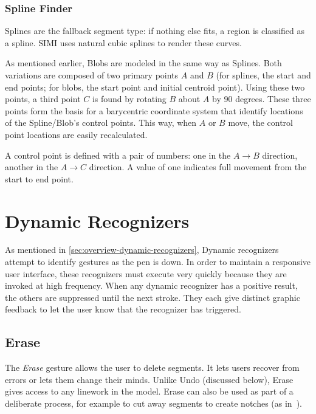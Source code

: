 \subsubsection{Spline Finder}

Splines are the fallback segment type: if nothing else fits, a region
is classified as a spline. SIMI uses natural cubic splines to render
these curves.

As mentioned earlier, Blobs are modeled in the same way as
Splines. Both variations are composed of two primary points $A$ and
$B$ (for splines, the start and end points; for blobs, the start point
and initial centroid point). Using these two points, a third point $C$
is found by rotating $B$ about $A$ by 90 degrees. These three points
form the basis for a barycentric coordinate system that identify
locations of the Spline/Blob's control points. This way, when $A$ or
$B$ move, the control point locations are easily recalculated.

A control point is defined with a pair of numbers: one in the
$A\rightarrow B$ direction, another in the $A\rightarrow C$ direction. A
value of one indicates full movement from the start to end point.



\section{Dynamic Recognizers}

As mentioned in \ref{sec:overview-dynamic-recognizers}, Dynamic
recognizers attempt to identify gestures as the pen is down. In order
to maintain a responsive user interface, these recognizers must
execute very quickly because they are invoked at high frequency. When
any dynamic recognizer has a positive result, the others are
suppressed until the next stroke. They each give distinct graphic
feedback to let the user know that the recognizer has triggered.

\subsection{Erase}


The \textit{Erase} gesture allows the user to delete segments. It lets
users recover from errors or lets them change their minds. Unlike Undo
(discussed below), Erase gives access to any linework in the
model. Erase can also be used as part of a deliberate process, for
example to cut away segments to create notches (as
in~\cite{zeleznik-lineogrammer}).

